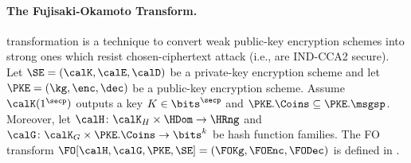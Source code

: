 \paragraph*{The Fujisaki-Okamoto Transform.} transformation \cite{C:FujOka99,JC:FujOka13} is a technique to convert weak public-key
encryption schemes into strong ones which resist chosen-ciphertext attack (i.e., are IND-CCA2 secure). Let $\SE=(\calK,\calE,\calD)$ be a private-key encryption scheme and let $\PKE=(\kg,\enc,\dec)$ be a public-key encryption scheme.   Assume $\calK(1^\secp)$ outputs a key $K \in \bits^{\secp}$ and $\PKE.\Coins \subseteq \PKE.\msgsp$.
Moreover, let $\calH \colon \calK_H \times \HDom \to \HRng$ and $\calG \colon \calK_G  \times \PKE.\Coins \to \bits^k$ be hash function families. 
The FO transform $\FO[\calH, \calG,\PKE,\SE] = (\FOKg, \FOEnc, \FODec)$ is defined in .

